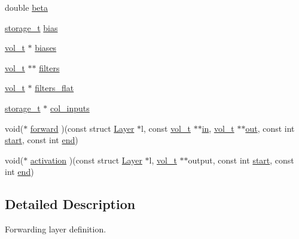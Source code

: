 \begin{DoxyCompactItemize}
double \hyperlink{structLayer_a30224d5e092e8740c22780a4dbeab06d}{beta}
\item 
\hyperlink{setting_8h_a3529be440b2ef96493a3e8c22fcfcecc}{storage\+\_\+t} \hyperlink{structLayer_a2aa2297fa35dc56c6d03a10a3402067e}{bias}
\item 
\hyperlink{data__structure_8h_a051bd2b17d42e70d86b4314e0dd8881e}{vol\+\_\+t} $\ast$ \hyperlink{structLayer_a670fe0bf57a84b104338661beb82a27c}{biases}
\item 
\hyperlink{data__structure_8h_a051bd2b17d42e70d86b4314e0dd8881e}{vol\+\_\+t} $\ast$$\ast$ \hyperlink{structLayer_aa92f4f42e91e5a9e2fcf8370095e8b5a}{filters}
\item 
\hyperlink{data__structure_8h_a051bd2b17d42e70d86b4314e0dd8881e}{vol\+\_\+t} $\ast$ \hyperlink{structLayer_ad33732c7bae16b97250b1a235a801937}{filters\+\_\+flat}
\item 
\hyperlink{setting_8h_a3529be440b2ef96493a3e8c22fcfcecc}{storage\+\_\+t} $\ast$ \hyperlink{structLayer_a7f3d8c93228c92633f65e22878aed50e}{col\+\_\+inputs}
\item 
void($\ast$ \hyperlink{structLayer_aec5e26e4dd832a4434d0285802024fc1}{forward} )(const struct \hyperlink{structLayer}{Layer} $\ast$l, const \hyperlink{data__structure_8h_a051bd2b17d42e70d86b4314e0dd8881e}{vol\+\_\+t} $\ast$$\ast$\hyperlink{max__pooling__layer__MultiCore_8h_ab943d53559ea6283e896bd8bf603b626}{in}, \hyperlink{data__structure_8h_a051bd2b17d42e70d86b4314e0dd8881e}{vol\+\_\+t} $\ast$$\ast$\hyperlink{max__pooling__layer__MultiCore_8h_abc600ae3097d3509f83258671cf3701e}{out}, const int \hyperlink{max__pooling__layer__MultiCore_8h_a79cb7003c3528d3096592502cbd07fb9}{start}, const int \hyperlink{max__pooling__layer__MultiCore_8h_a3efd06bf9a5c88624e60c85040903747}{end})
\item 
void($\ast$ \hyperlink{structLayer_ac500ea4fc58b3660b90a809a7a8e037a}{activation} )(const struct \hyperlink{structLayer}{Layer} $\ast$l, \hyperlink{data__structure_8h_a051bd2b17d42e70d86b4314e0dd8881e}{vol\+\_\+t} $\ast$$\ast$output, const int \hyperlink{max__pooling__layer__MultiCore_8h_a79cb7003c3528d3096592502cbd07fb9}{start}, const int \hyperlink{max__pooling__layer__MultiCore_8h_a3efd06bf9a5c88624e60c85040903747}{end})
\end{DoxyCompactItemize}


\subsection{Detailed Description}
Forwarding layer definition. 

